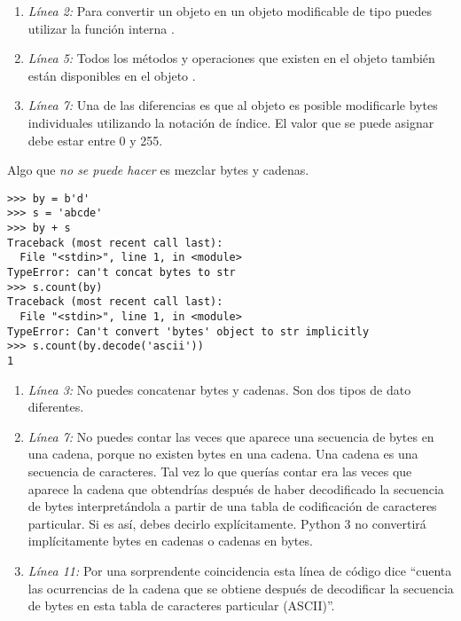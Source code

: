 \begin{enumerate}

\item \emph{Línea 2:} Para convertir un objeto  en un objeto modificable de tipo  puedes utilizar la función interna .

\item \emph{Línea 5:} Todos los métodos y operaciones que existen en el objeto  también están disponibles en el objeto .

\item \emph{Línea 7:} Una de las diferencias es que al objeto  es posible modificarle bytes individuales utilizando la notación de índice. El valor que se puede asignar debe estar entre 0 y 255.

\end{enumerate}

Algo que \emph{no se puede hacer} es mezclar bytes y cadenas.

\noindent\begin{minipage}{\textwidth}
\begin{lstlisting}[mathescape=True]
>>> by = b'd'
>>> s = 'abcde'
>>> by + s
Traceback (most recent call last):
  File "<stdin>", line 1, in <module>
TypeError: can't concat bytes to str
>>> s.count(by)
Traceback (most recent call last):
  File "<stdin>", line 1, in <module>
TypeError: Can't convert 'bytes' object to str implicitly
>>> s.count(by.decode('ascii'))
1
\end{lstlisting}
\end{minipage}

\begin{enumerate}

\item \emph{Línea 3:} No puedes concatenar bytes y cadenas. Son dos tipos de dato diferentes.

\item \emph{Línea 7:} No puedes contar las veces que aparece una secuencia de bytes en una cadena, porque no existen bytes en una cadena. Una cadena es una secuencia de caracteres. Tal vez lo que querías contar era las veces que aparece la cadena que obtendrías después de haber decodificado la secuencia de bytes interpretándola a partir de una tabla de codificación de caracteres particular. Si es así, debes decirlo explícitamente. Python 3 no convertirá implícitamente bytes en cadenas o cadenas en bytes.

\item \emph{Línea 11:} Por una sorprendente coincidencia esta línea de código dice ``cuenta las ocurrencias de la cadena que se obtiene después de decodificar la secuencia de bytes en esta tabla de caracteres particular (ASCII)''. 

\end{enumerate}


